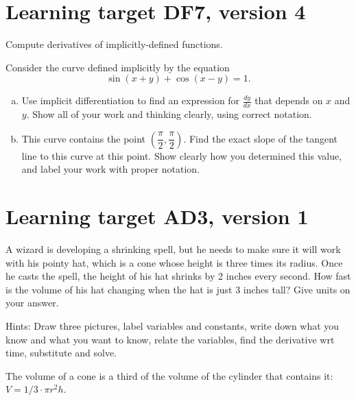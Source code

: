 \pagebreak

\section{Learning target DF7, version 4}

Compute derivatives of implicitly-defined functions.

\hrulefill

Consider the curve defined implicitly by the equation
\[\sin(x+y) + \cos(x-y) = 1.\]

\begin{enumerate}[(a)]
	\item Use implicit differentiation to find an expression for $\frac{dy}{dx}$ that depends on $x$ and $y$.  Show all of your work and thinking clearly, using correct notation.

	\vfill

	\item This curve contains the point \(\left(\dfrac\pi{2},\dfrac\pi{2}\right)\). Find the exact slope of the tangent line to this curve at this point. Show clearly how you determined this value, and label your work with proper notation.

	\vfill
\end{enumerate}
\pagebreak

\section{Learning target AD3, version 1}

A wizard is developing a shrinking spell, but he needs to make sure it will work with his pointy hat, which is a cone whose height is three times its radius. Once he casts the spell, the height of his hat shrinks by 2 inches every second. How fast is the volume of his hat changing when the hat is just 3 inches tall? Give units on your answer.

\vspace{1em}

{\tiny Hints: Draw three pictures, label variables and constants, write down what you know and what you want to know, relate the variables, find the derivative wrt time, substitute and solve. 

The volume of a cone is a third of the volume of the cylinder that contains it: $V = 1/3 \cdot \pi r^2 h$.}

